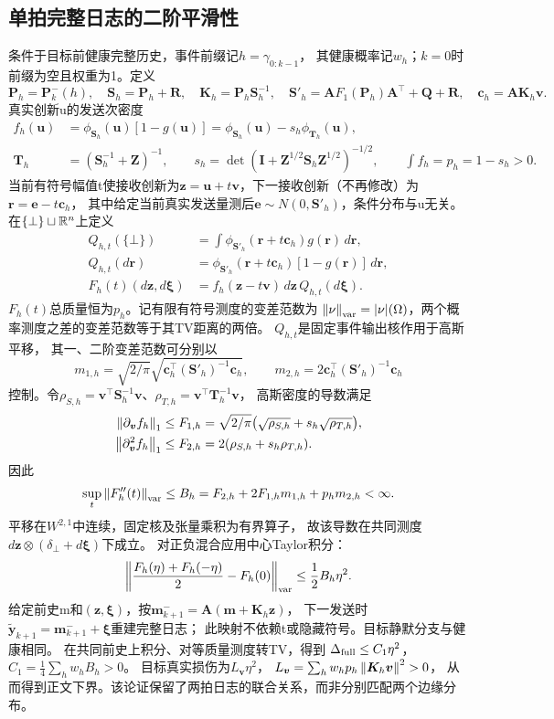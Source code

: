 \subsection{单拍完整日志的二阶平滑性}
条件于目标前健康完整历史，事件前缀记$h=\gamma_{0:k-1}$，
其健康概率记$w_h$；$k=0$时前缀为空且权重为1。定义
\[
{\bm{P}}_h={\bm{P}}_k^-(h),\quad {\bm{S}}_h={\bm{P}}_h+{\bm{R}},\quad {\bm{K}}_h={\bm{P}}_h{\bm{S}}_h^{-1},\quad
{\bm{S}}'_h={\bm{A}}F_1({\bm{P}}_h){\bm{A}}^\top+{\bm{Q}}+{\bm{R}},\quad {\bm{c}}_h={\bm{A}}{\bm{K}}_h{\bm{v}}.
\]
真实创新u的发送次密度
\begin{align*}
f_h({\bm{u}})&=\phi_{{\bm{S}}_h}({\bm{u}})[1-g({\bm{u}})]
=\phi_{{\bm{S}}_h}({\bm{u}})-s_h\phi_{{\bm{T}}_h}({\bm{u}}),\\
{\bm{T}}_h&=({\bm{S}}_h^{-1}+{\bm{Z}})^{-1},\qquad
s_h=\det({\bm{I}}+{\bm{Z}}^{1/2}{\bm{S}}_h{\bm{Z}}^{1/2})^{-1/2},\qquad
\int f_h=p_h=1-s_h>0.
\end{align*}
当前有符号幅值t使接收创新为${\bm{z}}={\bm{u}}+t{\bm{v}}$，下一接收创新（不再修改）为${\bm{r}}={\bm{e}}-t{\bm{c}}_h$，
其中给定当前真实发送量测后${\bm{e}}\sim N(0,{\bm{S}}'_h)$，条件分布与u无关。
在$\{\bot\}\sqcup\mathbb R^n$上定义
\begin{align*}
Q_{h,t}(\{\bot\})&=\int\phi_{{\bm{S}}'_h}({\bm{r}}+t{\bm{c}}_h)g({\bm{r}})\,d{\bm{r}},\\
Q_{h,t}(d{\bm{r}})&=\phi_{{\bm{S}}'_h}({\bm{r}}+t{\bm{c}}_h)[1-g({\bm{r}})]\,d{\bm{r}},\\
F_h(t)(d{\bm{z}},d{\bm{\xi}})&=f_h({\bm{z}}-t{\bm{v}})\,d{\bm{z}}\,Q_{h,t}(d{\bm{\xi}}).
\end{align*}
$F_h(t)$总质量恒为$p_h$。记有限有符号测度的变差范数为
$\left\|\nu\right\|_{\rm var}=|\nu|(\Omega)$，两个概率测度之差的变差范数等于其TV距离的两倍。
$Q_{h,t}$是固定事件输出核作用于高斯平移，
其一、二阶变差范数可分别以
\[
m_{1,h}=\sqrt{2/\pi}\sqrt{{\bm{c}}_h^\top({\bm{S}}'_h)^{-1}{\bm{c}}_h},\qquad
m_{2,h}=2{\bm{c}}_h^\top({\bm{S}}'_h)^{-1}{\bm{c}}_h
\]
控制。令$\rho_{S,h}={\bm{v}}^\top {\bm{S}}_h^{-1}{\bm{v}}$、$\rho_{T,h}={\bm{v}}^\top {\bm{T}}_h^{-1}{\bm{v}}$，
高斯密度的导数满足
\begin{align*}
\left\|\partial_{\bm{v}}f_h\right\|_1&\le F_{1,h}
=\sqrt{2/\pi}\bigl(\sqrt{\rho_{S,h}}+s_h\sqrt{\rho_{T,h}}\bigr),\\
\left\|\partial_{\bm{v}}^2f_h\right\|_1&\le F_{2,h}=2(\rho_{S,h}+s_h\rho_{T,h}).
\end{align*}
因此
\[
\sup_t\left\|F_h''(t)\right\|_{\rm var}
\le B_h=F_{2,h}+2F_{1,h}m_{1,h}+p_hm_{2,h}<\infty.
\]
平移在$W^{2,1}$中连续，固定核及张量乘积为有界算子，
故该导数在共同测度$d{\bm{z}}\otimes(\delta_\bot+d{\bm{\xi}})$下成立。
对正负混合应用中心Taylor积分：
\[
\left\|\frac{F_h(\eta)+F_h(-\eta)}2-F_h(0)\right\|_{\rm var}
\le\frac12B_h\eta^2.
\]
给定前史m和$({\bm{z}},{\bm{\xi}})$，按${\bm{m}}_{k+1}^-={\bm{A}}({\bm{m}}+{\bm{K}}_h{\bm{z}})$，
下一发送时$\tilde {\bm{y}}_{k+1}={\bm{m}}_{k+1}^-+{\bm{\xi}}$重建完整日志；
此映射不依赖t或隐藏符号。目标静默分支与健康相同。
在共同前史上积分、对等质量测度转TV，得到
$\Delta_{\rm full}\le C_1\eta^2$，
$C_1=\frac14\sum_hw_hB_h>0$。
目标真实损伤为$L_{\bm{v}}\eta^2$，
$L_{\bm{v}}=\sum_hw_hp_h\left\|{\bm{K}}_h{\bm{v}}\right\|^2>0$，
从而得到正文下界。该论证保留了两拍日志的联合关系，而非分别匹配两个边缘分布。

